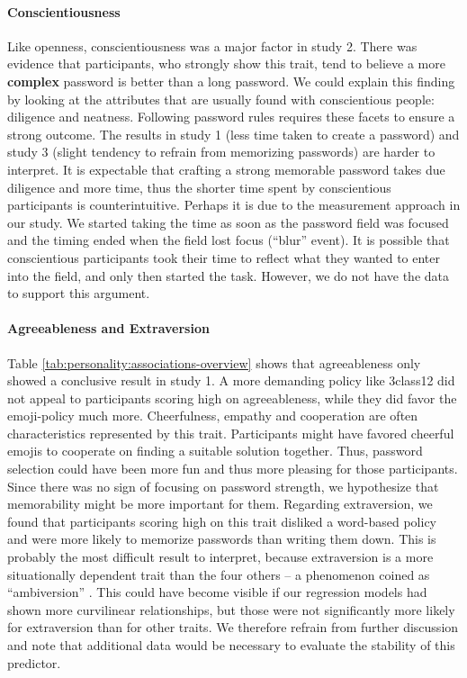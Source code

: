 \paragraph{Conscientiousness} Like openness, conscientiousness was a major factor in study 2. There was evidence that participants, who strongly show this trait, tend to believe a more \textbf{complex} password is better than a long password. We could explain this finding by looking at the attributes that are usually found with conscientious people: diligence and neatness. Following password rules requires these facets to ensure a strong outcome. The results in study 1 (less time taken to create a password) and study 3 (slight tendency to refrain from memorizing passwords) are harder to interpret. It is expectable that crafting a strong memorable password takes due diligence and more time, thus the shorter time spent by conscientious participants is counterintuitive. Perhaps it is due to the measurement approach in our study. We started taking the time as soon as the password field was focused and the timing ended when the field lost focus (``blur'' event). It is possible that conscientious participants took their time to reflect what they wanted to enter into the field, and only then started the task. However, we do not have the data to support this argument.


\paragraph{Agreeableness and Extraversion} Table \ref{tab:personality:associations-overview} shows that agreeableness only showed a conclusive result in study 1. A more demanding policy like 3class12 did not appeal to participants scoring high on agreeableness, while they did favor the emoji-policy much more. Cheerfulness, empathy and cooperation are often characteristics represented by this trait. 
Participants might have favored cheerful emojis to cooperate on finding a suitable solution together. Thus, password selection could have been more fun and thus more pleasing for those participants. Since there was no sign of focusing on password strength, we hypothesize that memorability might be more important for them. 
Regarding extraversion, we found that participants scoring high on this trait disliked a word-based policy and were more likely to memorize passwords than writing them down. This is probably the most difficult result to interpret, because extraversion is a more situationally dependent trait than the four others -- a phenomenon coined as ``ambiversion'' \cite{Grant2013Ambivert}. This could have become visible if our regression models had shown more curvilinear relationships, but those were not significantly more likely for extraversion than for other traits. We therefore refrain from further discussion and note that additional data would be necessary to evaluate the stability of this predictor. 

